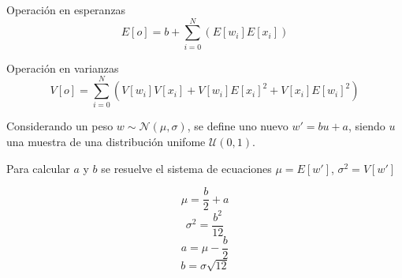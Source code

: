 Operación en esperanzas
\begin{equation} \label{eq:neuron_expected}
E[o] = b + \sum_{i=0}^N ( E[w_i] E[x_i] )
\end{equation}

Operación en varianzas
\begin{equation} \label{eq:neuron_variance}
V[o] = \sum_{i=0}^N ( V[w_i]V[x_i] + V[w_i]E[x_i]^2 + V[x_i]E[w_i]^2 )
\end{equation}

Considerando un peso $w \sim \mathcal{N}(\mu,\sigma)$, se define uno nuevo $w' = b u + a$, siendo $u$ una muestra de una distribución unifome $\mathcal{U}(0,1)$. 

Para calcular $a$ y $b$ se resuelve el sistema de ecuaciones $\mu = E[w']$, $\sigma^2 = V[w']$

\begin{equation} \label{eq:neuron_variance}
\mu = \dfrac{b}{2} + a
\end{equation}
\begin{equation} \label{eq:neuron_variance}
\sigma^2 = \dfrac{b^2}{12}
\end{equation}
\begin{equation} \label{eq:system_a}
a = \mu - \dfrac{b}{2}
\end{equation}
\begin{equation} \label{eq:system_b}
b = \sigma \sqrt{12}
\end{equation}
